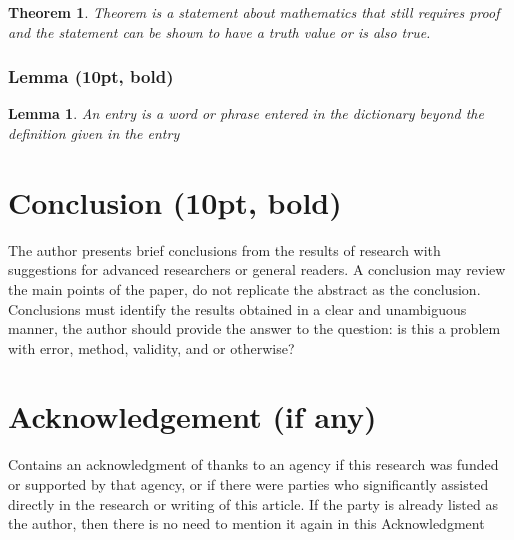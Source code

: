 \documentclass{article}
\newcounter{lemma}
\newtheorem{lemma}{Lemma}
\newcounter{theorem}
\newtheorem{theorem}{Theorem}
\begin{document}
\begin{theorem}
	 Theorem is a statement about mathematics that still requires proof and the statement can be shown to have a truth value or is also true.
\end{theorem}

\subsubsection{Lemma (10pt, bold)}
\begin{lemma}
	An entry is a word or phrase entered in the dictionary beyond the definition given in the entry
\end{lemma}

\section{Conclusion (10pt, bold)}
The author presents brief conclusions from the results of research with suggestions for advanced researchers or general readers. A conclusion may review the main points of the paper, do not replicate the abstract as the conclusion. Conclusions must identify the results obtained in a clear and unambiguous manner, the author should provide the answer to the question: is this a problem with error, method, validity, and or otherwise?

\section{Acknowledgement (if any)}
Contains an acknowledgment of thanks to an agency if this research was funded or supported by that agency, or if there were parties who significantly assisted directly in the research or writing of this article. If the party is already listed as the author, then there is no need to mention it again in this Acknowledgment

\end{document}
